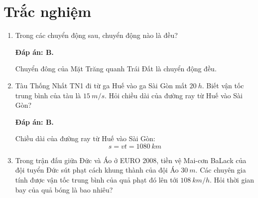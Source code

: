 \setcounter{section}{0}
\section{Trắc nghiệm}
\begin{enumerate}[label=\bfseries Câu \arabic*:]
	\item {}
	
	
	{Trong các chuyển động sau, chuyển động nào là đều?
	}
	
	\hideall
	{		\textbf{Đáp án: B.}
		
		Chuyển đông của Mặt Trăng quanh Trái Đất là chuyển động đều.
		
	}
	\item {}
	
	
	{Tàu Thống Nhất TN1 đi từ ga Huế vào ga Sài Gòn mất $\SI{20}{h}$. Biết vận tốc trung bình của tàu là $\SI{15}{m/s}$. Hỏi chiều dài của đường ray từ Huế vào Sài Gòn?
	}
	
	\hideall
	{		\textbf{Đáp án: B.}
		
		Chiều dài của đường ray từ Huế vào Sài Gòn:
		$$s=vt=\SI{1080}{km}$$
		
	}
	\item {}
	
	
	{Trong trận đấu giữa Đức và Áo ở EURO 2008, tiền vệ Mai-cơn BaLack của đội tuyển Đức sút phạt cách khung thành của đội Áo $\SI{30}{m}$. Các chuyên gia tính được vận tốc trung bình của quả phạt đó lên tới $\SI{108}{km/h}$. Hỏi thời gian bay của quả bóng là bao nhiêu?
	}
	

\end{enumerate}
